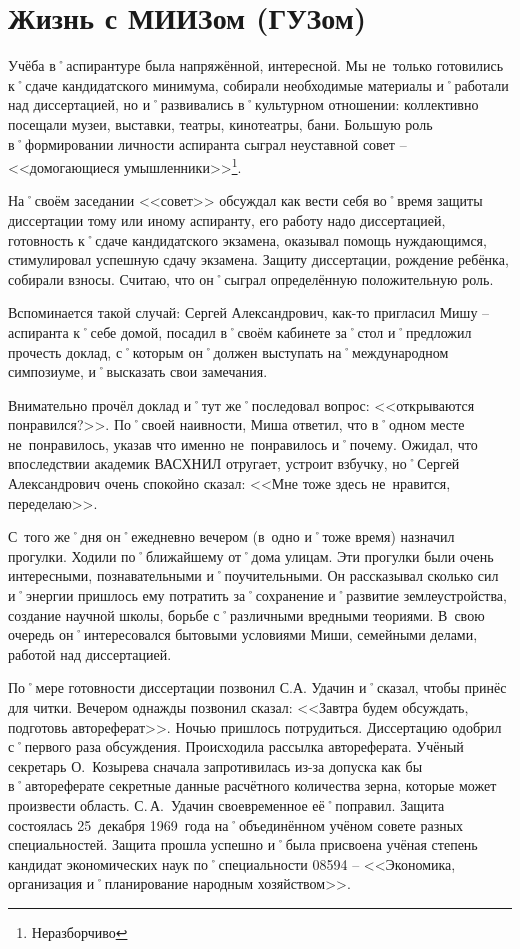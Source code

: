 ﻿\chapter{Жизнь с МИИЗом (ГУЗом)}

Учёба в˚аспирантуре была напряжённой, интересной. Мы не~только готовились к˚сдаче кандидатского минимума, собирали необходимые материалы и˚работали над диссертацией, но и˚развивались в˚культурном отношении: коллективно посещали музеи, выставки, театры, кинотеатры, бани. Большую роль в˚формировании личности аспиранта сыграл неуставной совет \--- <<домогающиеся умышленники>>\footnote{Неразборчиво}. 

На˚своём заседании <<совет>> обсуждал как вести себя во˚время защиты диссертации тому или иному аспиранту, его работу надо диссертацией, готовность к˚сдаче кандидатского экзамена, оказывал помощь нуждающимся, стимулировал успешную сдачу экзамена. Защиту диссертации, рождение ребёнка, собирали взносы. Считаю, что он˚сыграл определённую положительную роль.

Вспоминается такой случай: Сергей Александрович, как-то пригласил Мишу \--- аспиранта к˚себе домой, посадил в˚своём кабинете за˚стол и˚предложил прочесть доклад, с˚которым он˚должен выступать на˚международном симпозиуме, и˚высказать свои замечания.

Внимательно прочёл доклад и˚тут же˚последовал вопрос: <<открываются понравился?>>. По˚своей наивности, Миша ответил, что в˚одном месте не~понравилось, указав что именно не~понравилось и˚почему. Ожидал, что впоследствии академик ВАСХНИЛ отругает, устроит взбучку, но˚Сергей Александрович очень спокойно сказал: <<Мне тоже здесь не~нравится, переделаю>>.

С~того же˚дня он˚ежедневно вечером (в~одно и˚тоже время) назначил прогулки. Ходили по˚ближайшему от˚дома улицам. Эти прогулки были очень интересными, познавательными и˚поучительными. Он рассказывал сколько сил и˚энергии пришлось ему потратить за˚сохранение и˚развитие землеустройства, создание научной школы, борьбе с˚различными вредными теориями. В~свою очередь он˚интересовался бытовыми условиями Миши, семейными делами, работой над диссертацией.

По˚мере готовности диссертации позвонил С.А. Удачин и˚сказал, чтобы принёс для читки. Вечером однажды позвонил сказал: <<Завтра будем обсуждать, подготовь автореферат>>. Ночью пришлось потрудиться. Диссертацию одобрил с˚первого раза обсуждения. Происходила рассылка автореферата. Учёный секретарь О.~Козырева сначала запротивилась из-за допуска как бы в˚автореферате секретные данные расчётного количества зерна, которые может произвести область. С.\,А.~Удачин своевременное её˚поправил. Защита состоялась 25~декабря 1969~года на˚объединённом учёном совете разных специальностей. Защита прошла успешно и˚была присвоена учёная степень кандидат экономических наук по˚специальности 08594 \--- <<Экономика, организация и˚планирование народным хозяйством>>. 

